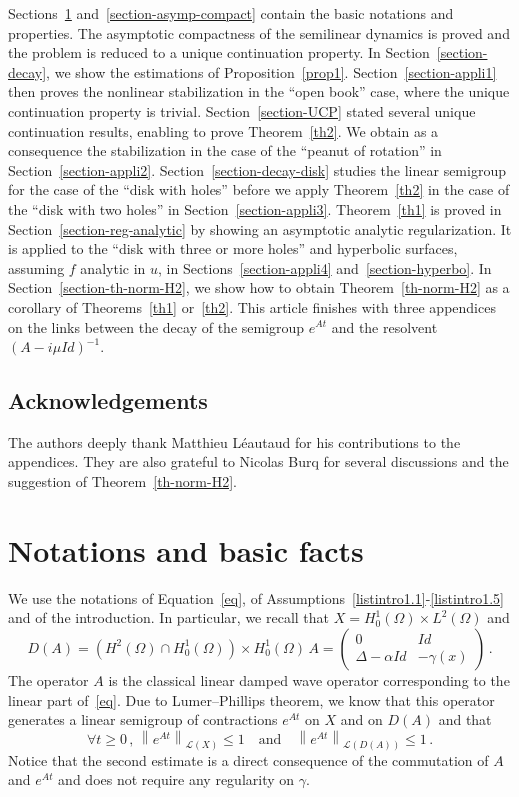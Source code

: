 \documentclass[AHL,Unicode,longabstracts]{cedram}
\newcommand{\Lc}{\mathcal{L}}
\let\oldforall\forall
\renewcommand*{\forall}{\mathrel{\oldforall}}
\begin{document}
Sections~\ref{section-basic} and~\ref{section-asymp-compact} contain the basic notations and properties. The asymptotic compactness of the semilinear dynamics is proved and the problem is reduced to a unique continuation property. In Section~\ref{section-decay}, we show the estimations of Proposition~\ref{prop1}. Section~\ref{section-appli1} then proves the nonlinear stabilization in the ``open book'' case, where the unique continuation property is trivial. Section~\ref{section-UCP} stated several unique continuation results, enabling to prove Theorem~\ref{th2}. We obtain as a consequence the stabilization in the case of the ``peanut of rotation'' in Section~\ref{section-appli2}. Section~\ref{section-decay-disk} studies the linear semigroup for the case of the ``disk with holes'' before we apply Theorem~\ref{th2} in the case of the ``disk with two holes'' in Section~\ref{section-appli3}. Theorem~\ref{th1} is proved in Section~\ref{section-reg-analytic} by showing an asymptotic analytic regularization. It is applied to the ``disk with three or more holes'' and hyperbolic surfaces, assuming $f$ analytic in $u$, in Sections~\ref{section-appli4} and~\ref{section-hyperbo}. In Section~\ref{section-th-norm-H2}, we show how to obtain Theorem~\ref{th-norm-H2} as a corollary of Theorems~\ref{th1} or~\ref{th2}. This article finishes with three appendices on the links between the decay of the semigroup $e^{At}$ and the resolvent $(A-i\mu Id)^{-1}$.

\subsection*{Acknowledgements}
The authors deeply thank Matthieu Léautaud for his contributions to the appendices. They are also grateful to Nicolas Burq for several discussions and the suggestion of Theorem~\ref{th-norm-H2}.



\section{Notations and basic facts}\label{section-basic}
We use the notations of Equation~\eqref{eq}, of Assumptions~\eqref{listintro1.1}-\eqref{listintro1.5} and of the introduction. In particular, we recall that $X=H^1_0(\Omega)\times L^2(\Omega)$ and
\[
D(A)=\left(H^2(\Omega)\cap H^1_0(\Omega)\right)\times H^1_0(\Omega)\,
A =
\begin{pmatrix}
0 & Id \\ \Delta-\alpha Id & -\gamma(x)
\end{pmatrix}\,.
\]
The operator $A$ is the classical linear damped wave operator corresponding to the linear part of~\eqref{eq}. Due to Lumer--Phillips theorem, we know that this operator generates a linear semigroup of contractions $e^{At}$ on $X$ and on $D(A)$ and that
\[
\forall t\geq 0\,,\,\left\|e^{At}\right\|_{\Lc(X)}\leq 1\quad\text{and}\quad\left\|e^{At}\right\|_{\Lc(D(A))}\leq 1\,.
\]
Notice that the second estimate is a direct consequence of the commutation of $A$ and $e^{At}$ and does not require any regularity on $\gamma$.
\end{document}
